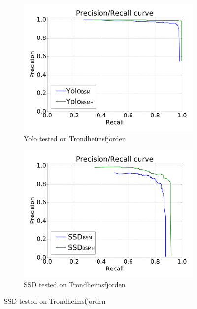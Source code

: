 \begin{figure}[h!]
\begin{subfigure}{.5\textwidth}
  \centering
  \includegraphics[width=0.8\linewidth]{results/case_buildings/prec_recall/yolo/trf-eps.png}
  \caption{Yolo tested on Trondheimsfjorden}
  \label{fig:sfig1}
\end{subfigure}%
\begin{subfigure}{.5\textwidth}
  \centering
  \includegraphics[width=.8\linewidth]{results/case_buildings/prec_recall/ssd/trf-eps.png}
  \caption{SSD tested on Trondheimsfjorden}
  \label{fig:sfig2}
\end{subfigure}


\end{figure}
